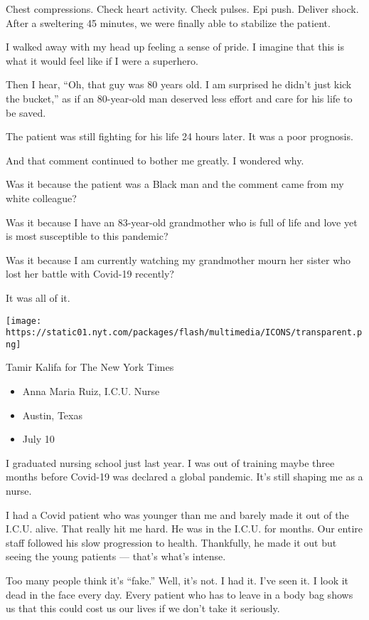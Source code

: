 Chest compressions. Check heart activity. Check pulses. Epi push.
Deliver shock. After a sweltering 45 minutes, we were finally able to
stabilize the patient.

I walked away with my head up feeling a sense of pride. I imagine that
this is what it would feel like if I were a superhero.

Then I hear, ``Oh, that guy was 80 years old. I am surprised he didn't
just kick the bucket,'' as if an 80-year-old man deserved less effort
and care for his life to be saved.

The patient was still fighting for his life 24 hours later. It was a
poor prognosis.

And that comment continued to bother me greatly. I wondered why.

Was it because the patient was a Black man and the comment came from my
white colleague?

Was it because I have an 83-year-old grandmother who is full of life and
love yet is most susceptible to this pandemic?

Was it because I am currently watching my grandmother mourn her sister
who lost her battle with Covid-19 recently?

It was all of it.

\texttt{[image: https://static01.nyt.com/packages/flash/multimedia/ICONS/transparent.png]}

Tamir Kalifa for The New York Times

\begin{itemize}
\tightlist
\item
  Anna Maria Ruiz, I.C.U. Nurse
\item
  Austin, Texas
\item
  July 10
\end{itemize}

I graduated nursing school just last year. I was out of training maybe
three months before Covid-19 was declared a global pandemic. It's still
shaping me as a nurse.

I had a Covid patient who was younger than me and barely made it out of
the I.C.U. alive. That really hit me hard. He was in the I.C.U. for
months. Our entire staff followed his slow progression to health.
Thankfully, he made it out but seeing the young patients --- that's
what's intense.

Too many people think it's ``fake.'' Well, it's not. I had it. I've seen
it. I look it dead in the face every day. Every patient who has to leave
in a body bag shows us that this could cost us our lives if we don't
take it seriously.

